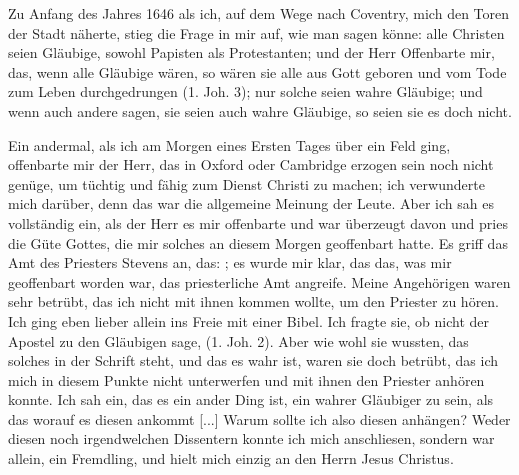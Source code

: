 Zu Anfang des Jahres 1646 als ich, auf dem Wege nach
Coventry, mich den Toren der Stadt näherte, stieg die Frage in
mir auf, wie man sagen könne: alle Christen seien Gläubige, sowohl 
Papisten als Protestanten; und der Herr Offenbarte mir,
das, wenn alle Gläubige wären, so wären sie alle aus Gott 
geboren und vom Tode zum Leben durchgedrungen (1. Joh. 3);
nur solche seien wahre Gläubige; und wenn auch andere sagen,
sie seien auch wahre Gläubige, so seien sie es doch nicht.

Ein andermal, als ich am Morgen eines Ersten Tages über
ein Feld ging, offenbarte mir der Herr, das in Oxford oder 
Cambridge erzogen sein noch nicht genüge, um tüchtig und fähig zum
Dienst Christi zu machen; ich verwunderte mich darüber, denn
das war die allgemeine Meinung der Leute. Aber ich sah es
vollständig ein, als der Herr es mir offenbarte und war überzeugt 
davon und pries die Güte Gottes, die mir solches an diesem
Morgen geoffenbart hatte. Es griff das Amt des Priesters Stevens
an, das: ; es
wurde mir klar, das das, was mir geoffenbart worden war, das
priesterliche Amt angreife. Meine Angehörigen waren sehr betrübt,
das ich nicht mit ihnen kommen wollte, um den Priester zu hören.
Ich ging eben lieber allein ins Freie mit einer Bibel. Ich fragte sie,
ob nicht der Apostel zu den Gläubigen sage,  (1. Joh. 2). Aber wie wohl 
sie wussten, das solches in der Schrift steht, und das es
wahr ist, waren sie doch betrübt, das ich mich in diesem Punkte
nicht unterwerfen und mit ihnen den Priester anhören konnte.
Ich sah ein, das es ein ander Ding ist, ein wahrer Gläubiger
zu sein, als das worauf es diesen ankommt [...] Warum sollte
ich also diesen anhängen? Weder diesen noch irgendwelchen
Dissentern konnte ich mich anschliesen, sondern war allein, ein
Fremdling, und hielt mich einzig an den Herrn Jesus Christus.

